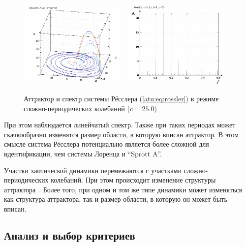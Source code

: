 \begin{figure}[ht!]
\begin{center}
  \includegraphics[width=0.49\textwidth]{p/cha/ross/ross0-p_xyz_c=25x00.png}
  \hfill
  \includegraphics[width=0.49\textwidth]{p/cha/ross/ross_f-p_f_c=25x00.png}
\end{center}
  \caption{Аттрактор и спектр системы Рёсслера (\ref{atu:eq:rossler}) в режиме сложно-периодических колебаний ($c=25.0$)}
\label{atu:f:ross_attractor_2500}
\end{figure}

При этом наблюдается линейчатый спектр. Также при
таких периодах может скачкообразно изменятся
размер области, в которую вписан аттрактор.
В этом смысле система Рёсслера потенциально является более сложной
для идентификации, чем системы Лоренца и ``Sprott A''.

Участки хаотической динамики перемежаются с участками сложно-периодических
колебаний. При этом происходит изменение структуры аттрактора~\cite{buscarino_sync_rossler,rosalie_rossler_template}.
Более того, при одном и том же типе динамики может изменяться как структура аттрактора,
так и размер области, в которую он может быть вписан.

%



\subsection{Анализ и выбор критериев}  %

